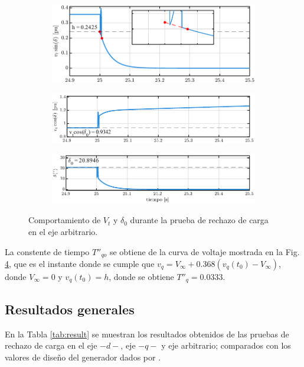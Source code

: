 \documentclass[conference]{IEEEtran}
\begin{document}
\begin{figure}[ht]
    \centering
    \begin{subfigure}
        \centering
        \includegraphics[width=\linewidth]{Fig/fig6.pdf}
        \label{fig:fig6}
    \end{subfigure}
    \hfill
    \begin{subfigure}
        \centering
        \includegraphics[width=\linewidth]{Fig/fig7.pdf}
        \label{fig:fig7}
    \end{subfigure}
    \hfill
    \begin{subfigure}
        \centering
        \includegraphics[width=\linewidth]{Fig/fig8.pdf}    
        \label{fig:fig8}
    \end{subfigure}
    \caption{Comportamiento de $V_t$ y $\delta_0$ durante la prueba de rechazo de carga en el eje arbitrario.}
    \label{fig:subfigs1}
\end{figure}

La constente de tiempo $T''_{qo}$ se obtiene de la curva de voltaje mostrada en la Fig. \ref{fig:subfigs1}, que es el instante donde se 
cumple que $v_q = V_{\infty} + 0.368(v_q(t_0)-V_\infty)$, donde $V_\infty = 0$ y $v_q(t_0) = h$, donde se obtiene $T''_q = 0.0333$.

\subsection{Resultados generales}
En la Tabla \ref{tab:result} se muestran los resultados obtenidos de las pruebas de rechazo de carga en el eje $-d-$, eje $-q-$ y eje arbitrario; comparados con los valores de diseño del generador dados por \cite{pequena}.
\end{document}
